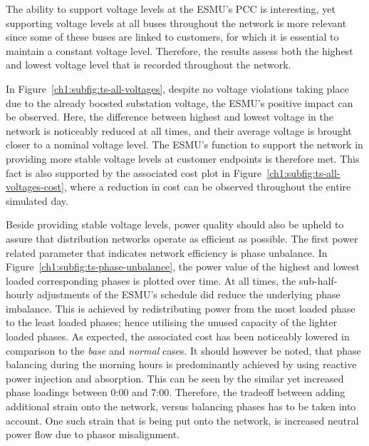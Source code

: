 The ability to support voltage levels at the ESMU's PCC is interesting, yet supporting voltage levels at all buses throughout the network is more relevant since some of these buses are linked to customers, for which it is essential to maintain a constant voltage level.
Therefore, the results assess both the highest and lowest voltage level that is recorded throughout the network.



In Figure~\ref{ch1:subfig:ts-all-voltages}, despite no voltage violations taking place due to the already boosted substation voltage, the ESMU's positive impact can be observed.
Here, the difference between highest and lowest voltage in the network is noticeably reduced at all times, and their average voltage is brought closer to a nominal voltage level.
The ESMU's function to support the network in providing more stable voltage levels at customer endpoints is therefore met.
This fact is also supported by the associated cost plot in Figure~\ref{ch1:subfig:ts-all-voltages-cost}, where a reduction in cost can be observed throughout the entire simulated day.



Beside providing stable voltage levels, power quality should also be upheld to assure that distribution networks operate as efficient as possible.
The first power related parameter that indicates network efficiency is phase unbalance.
In Figure~\ref{ch1:subfig:ts-phase-unbalance}, the power value of the highest and lowest loaded corresponding phases is plotted over time.
At all times, the sub-half-hourly adjustments of the ESMU's schedule did reduce the underlying phase imbalance.
This is achieved by redistributing power from the most loaded phase to the least loaded phases; hence utilising the unused capacity of the lighter loaded phases.
As expected, the associated cost has been noticeably lowered in comparison to the \textit{base} and \textit{normal} cases.
It should however be noted, that phase balancing during the morning hours is predominantly achieved by using reactive power injection and absorption.
This can be seen by the similar yet increased phase loadings between 0:00 and 7:00.
Therefore, the tradeoff between adding additional strain onto the network, versus balancing phases has to be taken into account.
One such strain that is being put onto the network, is increased neutral power flow due to phasor misalignment.



